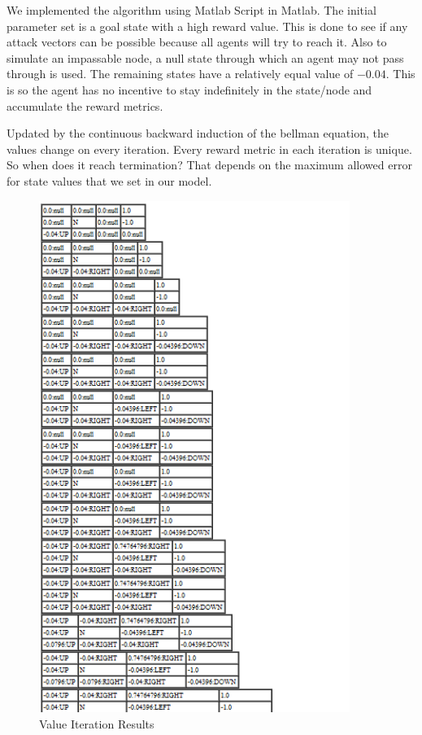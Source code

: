 We implemented the algorithm using Matlab Script in Matlab. The
initial parameter set is a goal state with a high
reward value. This is done to see if any attack vectors can be possible because
all agents will try to reach it. Also to simulate an impassable node, a null
state through which an agent may not pass through is used. The
remaining states have a relatively equal value of \(-0.04\). This is so the agent
has no incentive to stay indefinitely in the state/node and accumulate the
reward metrics.

Updated by the continuous backward induction of the bellman equation,
the values change on every iteration. Every reward metric in
each iteration is unique. So when does it reach termination? That depends on the
maximum allowed error for state values that we set in our model. 
\FloatBarrier 
\begin{figure}[h!]
    \begin{center}
        \includegraphics[width=0.90\textwidth]{Figures/Planning_Figure_2.png}
        \caption{Value Iteration Results}
        \label{fig:ValueIterationResults}
    \end{center}
\end{figure}

